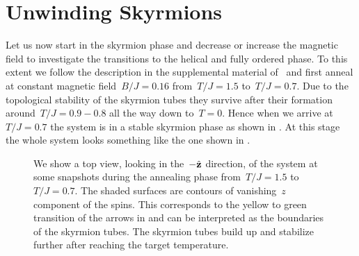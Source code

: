 \section{Unwinding Skyrmions}\label{sec:transitions}
%
Let us now start in the skyrmion phase and decrease or increase the magnetic
field to investigate the transitions to the helical and fully ordered phase. To
this extent we follow the description in the supplemental material
of~\cite{Milde} and first anneal at constant magnetic field~$B/J=0.16$
from~$T/J=1.5$ to~$T/J=0.7$. Due to the topological stability of the skyrmion
tubes they survive after their formation around~$T/J = 0.9 - 0.8$ all the way
down to~$T=0$. Hence when we arrive at~$T/J=0.7$ the system is in a stable
skyrmion phase as shown in . At this stage the whole
system looks something like the one shown in .

\begin{figure}[H]
  \centering
  \caption{We show a top view, \ie{} looking in the~$-\hat{\mathbf{z}}$ direction, of the
  system at some snapshots during the annealing phase from~$T/J = 1.5$
  to~$T/J=0.7$. The shaded surfaces are contours of vanishing~$z$ component of
  the spins. This corresponds to the yellow to green transition of the arrows in
   and can be interpreted as the boundaries of the skyrmion
  tubes. The skyrmion tubes build up and stabilize further after reaching the
  target temperature.}
\label{fig:skyrmanneal}
\end{figure}


